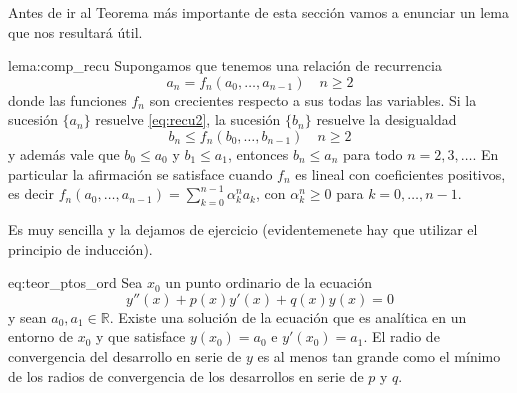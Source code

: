 Antes de ir al Teorema más importante de esta sección vamos a enunciar un  lema que nos resultará útil.

\begin{lema}[Comparación]{lema:comp_recu}  Supongamos que tenemos una relación de recurrencia
 \begin{equation}\label{eq:recu2} a_{n}=f_n(a_0,\ldots,a_{n-1})\quad n\geq 2\end{equation}
donde las funciones $f_n$ son crecientes respecto a sus todas las variables. Si la sucesión  $\{a_n\}$ resuelve \eqref{eq:recu2}, la sucesión  $\{b_n\}$ resuelve la desigualdad
 \[b_{n}\leq f_n(b_0,\ldots,b_{n-1})\quad n\geq 2 \]
y además vale que  $b_0\leq a_0$ y $b_1\leq a_1$, entonces $b_n\leq a_n$ para todo $n=2,3,\ldots$. En particular la afirmación se satisface cuando $f_n$ es lineal con coeficientes positivos, es decir $f_n(a_0,\ldots,a_{n-1})=\sum_{k=0}^{n-1}\alpha^n_ka_k$, con $\alpha^n_k\geq 0$ para $k=0,\ldots,n-1$.
\end{lema}
\begin{demo}
Es muy sencilla y la dejamos de ejercicio (evidentemenete hay que utilizar el principio de inducción).
\end{demo}


\begin{teorema}{eq:teor_ptos_ord} Sea $x_0$ un punto ordinario de la ecuación
\[y''(x)+p(x)y'(x)+q(x)y(x)=0\]
y sean $a_0,a_1\in\mathbb{R}$. Existe una solución de la ecuación que es analítica en un entorno de $x_0$ y que satisface $y(x_0)=a_0$ e $y'(x_0)=a_1$. El radio de convergencia del desarrollo en serie de $y$ es al menos tan grande como el mínimo de los radios de convergencia de los desarrollos en serie de $p$ y $q$.
\end{teorema}

